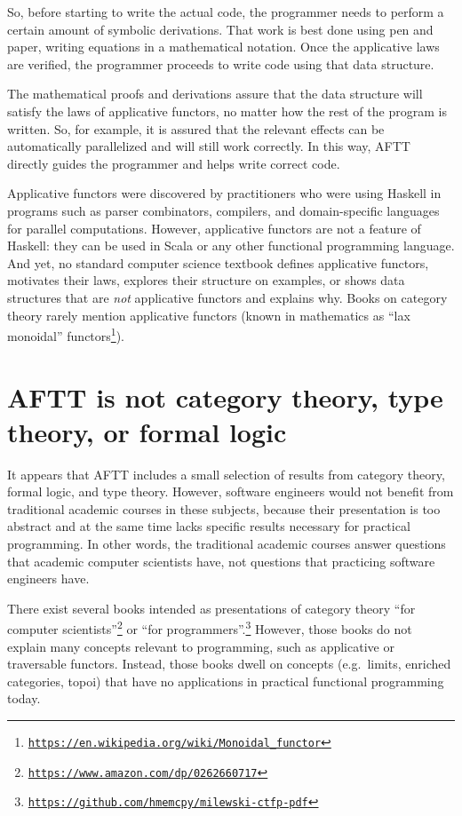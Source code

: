 So, before starting to write the actual code, the programmer needs
to perform a certain amount of symbolic derivations. That work is
best done using pen and paper, writing equations in a mathematical
notation. Once the applicative laws are verified, the programmer proceeds
to write code using that data structure.

The mathematical proofs and derivations assure that the data structure
will satisfy the laws of applicative functors, no matter how the rest
of the program is written. So, for example, it is assured that the
relevant effects can be automatically parallelized and will still
work correctly. In this way, AFTT directly guides the programmer and
helps write correct code.

Applicative functors were discovered by practitioners who were using
Haskell in programs such as parser combinators, compilers, and domain-specific
languages for parallel computations. However, applicative functors
are not a feature of Haskell: they can be used in Scala or any other
functional programming language. And yet, no standard computer science
textbook defines applicative functors, motivates their laws, explores
their structure on examples, or shows data structures that are \emph{not}
applicative functors and explains why. Books on category theory rarely
mention applicative functors (known in mathematics as \textsf{``}lax monoidal\textsf{''}
functors\footnote{\texttt{\href{https://en.wikipedia.org/wiki/Monoidal_functor}{https://en.wikipedia.org/wiki/Monoidal\_functor}}}).

\section{AFTT is not category theory, type theory, or formal logic}

It appears that AFTT includes a small selection of results from category
theory, formal logic, and type theory. However, software engineers
would not benefit from traditional academic courses in these subjects,
because their presentation is too abstract and at the same time lacks
specific results necessary for practical programming. In other words,
the traditional academic courses answer questions that academic computer
scientists have, not questions that practicing software engineers
have.

There exist several books intended as presentations of category theory
\textsf{``}for computer scientists\textsf{''}\footnote{\texttt{\href{https://www.amazon.com/dp/0262660717}{https://www.amazon.com/dp/0262660717}}}
or \textsf{``}for programmers\textsf{''}.\footnote{\texttt{\href{https://github.com/hmemcpy/milewski-ctfp-pdf}{https://github.com/hmemcpy/milewski-ctfp-pdf}}}
However, those books do not explain many concepts relevant to programming,
such as applicative or traversable functors. Instead, those books
dwell on concepts (e.g.~limits, enriched categories, topoi) that
have no applications in practical functional programming today.

